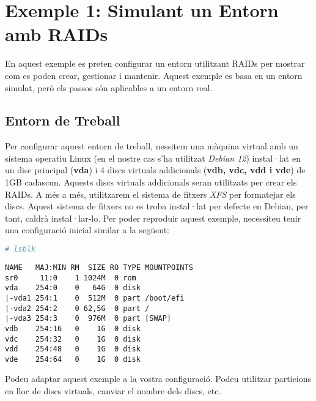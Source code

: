 \section{Exemple 1: Simulant un Entorn amb RAIDs}\label{simulant-un-entorn-amb-raids}

En aquest exemple es preten configurar un entorn utilitzant RAIDs per mostrar com es poden crear, gestionar i mantenir. Aquest exemple es basa en un entorn simulat, però els passos són aplicables a un entorn real. 

\subsection{Entorn de Treball}\label{entorn-de-treball}

Per configurar aquest entorn de treball, nessitem una màquina virtual amb un sistema operatiu Linux (en el nostre cas s'ha utilitzat \emph{Debian 12}) instal·lat en un disc principal (\textbf{vda}) i 4 discs virtuals addicionals (\textbf{vdb, vdc, vdd i vde}) de 1GB cadascun. Aquests discs virtuals addicionals seran utilitzats per crear els RAIDs. A més a més, utilitzarem el sistema de fitxers \emph{XFS} per formatejar els discs. Aquest sistema de fitxers no es troba instal·lat per defecte en Debian, per tant, caldrà instal·lar-lo. Per poder reproduir aquest exemple, necessiteu tenir una configuració inicial similar a la següent:

\begin{lstlisting}[language=bash, numbers=none, commentstyle=\color{black}]
# lsblk
\end{lstlisting}

\begin{terminaloutput}
\footnotesize\begin{verbatim}
NAME   MAJ:MIN RM  SIZE RO TYPE MOUNTPOINTS
sr0     11:0    1 1024M  0 rom
vda    254:0    0   64G  0 disk
|-vda1 254:1    0  512M  0 part /boot/efi
|-vda2 254:2    0 62,5G  0 part /
|-vda3 254:3    0  976M  0 part [SWAP]
vdb    254:16   0    1G  0 disk
vdc    254:32   0    1G  0 disk
vdd    254:48   0    1G  0 disk
vde    254:64   0    1G  0 disk
\end{verbatim}
\end{terminaloutput}
  
\begin{warning}
Podeu adaptar aquest exemple a la vostra configuració. Podeu utilitzar particions en lloc de discs virtuals, canviar el nombre dels discs, etc.
\end{warning}

